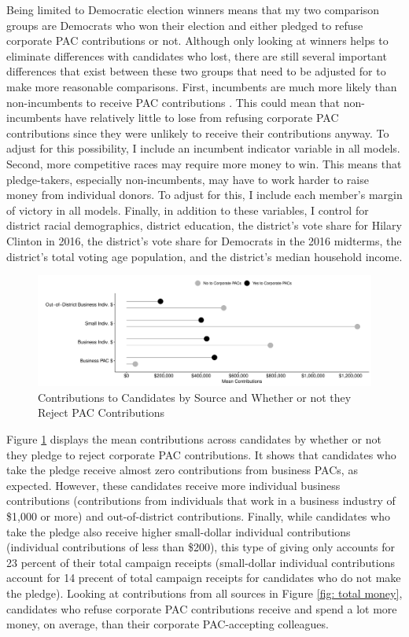 \documentclass[12pt]{article}
\begin{document}
Being limited to Democratic election winners means that my two comparison groups are Democrats who won their election and either pledged to refuse corporate PAC contributions or not. Although only looking at winners helps to eliminate differences with candidates who lost, there are still several important differences that exist between these two groups that need to be adjusted for to make more reasonable comparisons. First, incumbents are much more likely than non-incumbents to receive PAC contributions \citep{opensecrets.org2019a}. This could mean that non-incumbents have relatively little to lose from refusing corporate PAC contributions since they were unlikely to receive their contributions anyway. To adjust for this possibility, I include an incumbent indicator variable in all models. Second, more competitive races may require more money to win. This means that pledge-takers, especially non-incumbents, may have to work harder to raise money from individual donors. To adjust for this, I include each member's margin of victory in all models. Finally, in addition to these variables, I control for district racial demographics, district education, the district's vote share for Hilary Clinton in 2016, the district's vote share for Democrats in the 2016 midterms, the district's total voting age population, and the district's median household income.

\begin{figure}[!ht]
    \centering
    \includegraphics[width=0.9\linewidth]{all_candy.pdf}
    \caption{Contributions to Candidates by Source and Whether or not they Reject PAC Contributions}
    \label{fig: all contribs}
\end{figure}

Figure \ref{fig: all contribs} displays the mean contributions across candidates by whether or not they pledge to reject corporate PAC contributions. It shows that candidates who take the pledge receive almost zero contributions from business PACs, as expected. However, these candidates receive more individual business contributions (contributions from individuals that work in a business industry of \$1,000 or more) and out-of-district contributions.  Finally, while candidates who take the pledge also receive higher small-dollar individual contributions (individual contributions of less than \$200), this type of giving only accounts for 23 percent of their total campaign receipts (small-dollar individual contributions account for 14 precent of total campaign receipts for candidates who do not make the pledge). Looking at contributions from all sources in Figure \ref{fig: total money}, candidates who refuse corporate PAC contributions receive and spend a lot more money, on average, than their corporate PAC-accepting colleagues. 
\end{document}
